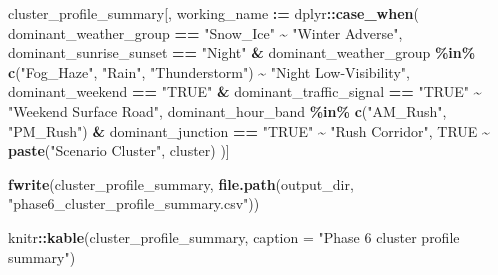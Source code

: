 \documentclass[
]{article}
\newenvironment{Shaded}{\begin{snugshade}}{\end{snugshade}}
\newcommand{\AttributeTok}[1]{\textcolor[rgb]{0.13,0.29,0.53}{#1}}
\newcommand{\ConstantTok}[1]{\textcolor[rgb]{0.56,0.35,0.01}{#1}}
\newcommand{\FunctionTok}[1]{\textcolor[rgb]{0.13,0.29,0.53}{\textbf{#1}}}
\newcommand{\NormalTok}[1]{#1}
\newcommand{\SpecialCharTok}[1]{\textcolor[rgb]{0.81,0.36,0.00}{\textbf{#1}}}
\newcommand{\StringTok}[1]{\textcolor[rgb]{0.31,0.60,0.02}{#1}}
\begin{document}
\begin{Shaded}
\begin{Highlighting}[]
\NormalTok{cluster\_profile\_summary[, working\_name }\SpecialCharTok{:=}\NormalTok{ dplyr}\SpecialCharTok{::}\FunctionTok{case\_when}\NormalTok{(}
\NormalTok{  dominant\_weather\_group }\SpecialCharTok{==} \StringTok{"Snow\_Ice"} \SpecialCharTok{\textasciitilde{}} \StringTok{"Winter Adverse"}\NormalTok{,}
\NormalTok{  dominant\_sunrise\_sunset }\SpecialCharTok{==} \StringTok{"Night"} \SpecialCharTok{\&}\NormalTok{ dominant\_weather\_group }\SpecialCharTok{\%in\%} \FunctionTok{c}\NormalTok{(}\StringTok{"Fog\_Haze"}\NormalTok{, }\StringTok{"Rain"}\NormalTok{, }\StringTok{"Thunderstorm"}\NormalTok{) }\SpecialCharTok{\textasciitilde{}} \StringTok{"Night Low{-}Visibility"}\NormalTok{,}
\NormalTok{  dominant\_weekend }\SpecialCharTok{==} \StringTok{"TRUE"} \SpecialCharTok{\&}\NormalTok{ dominant\_traffic\_signal }\SpecialCharTok{==} \StringTok{"TRUE"} \SpecialCharTok{\textasciitilde{}} \StringTok{"Weekend Surface Road"}\NormalTok{,}
\NormalTok{  dominant\_hour\_band }\SpecialCharTok{\%in\%} \FunctionTok{c}\NormalTok{(}\StringTok{"AM\_Rush"}\NormalTok{, }\StringTok{"PM\_Rush"}\NormalTok{) }\SpecialCharTok{\&}\NormalTok{ dominant\_junction }\SpecialCharTok{==} \StringTok{"TRUE"} \SpecialCharTok{\textasciitilde{}} \StringTok{"Rush Corridor"}\NormalTok{,}
  \ConstantTok{TRUE} \SpecialCharTok{\textasciitilde{}} \FunctionTok{paste}\NormalTok{(}\StringTok{"Scenario Cluster"}\NormalTok{, cluster)}
\NormalTok{)]}

\FunctionTok{fwrite}\NormalTok{(cluster\_profile\_summary, }\FunctionTok{file.path}\NormalTok{(output\_dir, }\StringTok{"phase6\_cluster\_profile\_summary.csv"}\NormalTok{))}

\NormalTok{knitr}\SpecialCharTok{::}\FunctionTok{kable}\NormalTok{(cluster\_profile\_summary, }\AttributeTok{caption =} \StringTok{"Phase 6 cluster profile summary"}\NormalTok{)}
\end{Highlighting}
\end{Shaded}
\end{document}
